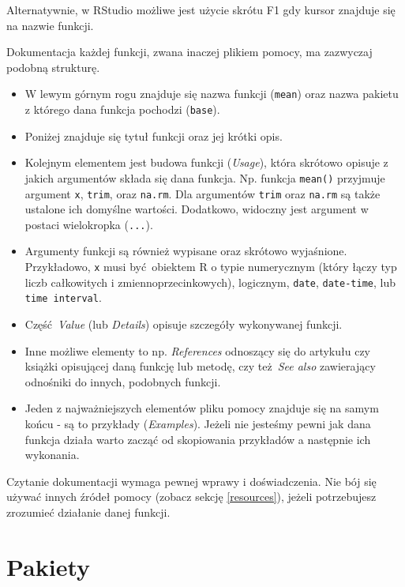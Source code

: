 \documentclass[paper=6in:9in,pagesize=pdftex,headinclude=on,footinclude=on,10pt]{scrbook}
\providecommand{\tightlist}{%
  \setlength{\itemsep}{0pt}\setlength{\parskip}{0pt}}
\begin{document}
Alternatywnie, w RStudio możliwe jest użycie skrótu F1 gdy kursor znajduje się na nazwie funkcji.

Dokumentacja każdej funkcji, zwana inaczej plikiem pomocy, ma zazwyczaj podobną strukturę.

\begin{itemize}
\tightlist
\item
  W lewym górnym rogu znajduje się nazwa funkcji (\texttt{mean}) oraz nazwa pakietu z którego dana funkcja pochodzi (\texttt{base}).
\item
  Poniżej znajduje się tytuł funkcji oraz jej krótki opis.
\item
  Kolejnym elementem jest budowa funkcji (\emph{Usage}), która skrótowo opisuje z jakich argumentów składa się dana funkcja.
  Np. funkcja \texttt{mean()} przyjmuje argument \texttt{x}, \texttt{trim}, oraz \texttt{na.rm}.
  Dla argumentów \texttt{trim} oraz \texttt{na.rm} są także ustalone ich domyślne wartości.
  Dodatkowo, widoczny jest argument w postaci wielokropka (\texttt{...}).
\item
  Argumenty funkcji są również wypisane oraz skrótowo wyjaśnione.
  Przykładowo, \texttt{x} musi być~obiektem R o typie numerycznym (który łączy typ liczb całkowitych i zmiennoprzecinkowych), logicznym, \texttt{date}, \texttt{date-time}, lub \texttt{time\ interval}.
\item
  Część~\emph{Value} (lub \emph{Details}) opisuje szczegóły wykonywanej funkcji.
\item
  Inne możliwe elementy to np. \emph{References} odnoszący się do artykułu czy książki opisującej daną funkcję lub metodę, czy też~\emph{See also} zawierający odnośniki do innych, podobnych funkcji.
\item
  Jeden z najważniejszych elementów pliku pomocy znajduje się na samym końcu - są to przykłady (\emph{Examples}).
  Jeżeli nie jesteśmy pewni jak dana funkcja działa warto zacząć od skopiowania przykładów a następnie ich wykonania.
\end{itemize}

Czytanie dokumentacji wymaga pewnej wprawy i doświadczenia.
Nie bój się używać innych źródeł pomocy (zobacz sekcję \ref{resources}), jeżeli potrzebujesz zrozumieć działanie danej funkcji.

\hypertarget{pakiety}{%
\section{Pakiety}\label{pakiety}}
\end{document}

